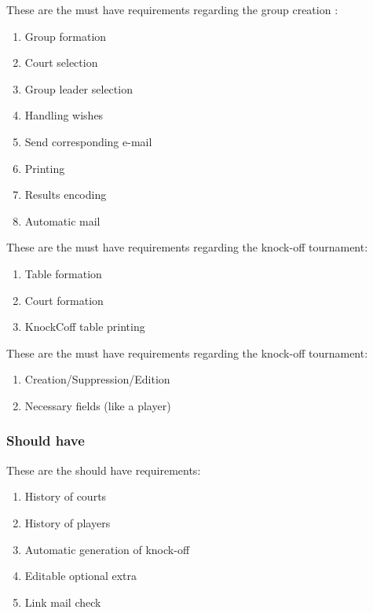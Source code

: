 These are the must have requirements regarding the group creation :\newline

\begin{enumerate} \itemsep1pt
\item \textcolor{green!60!black} {Group formation}
\item \textcolor{green!60!black} {Court selection}
\item \textcolor{green!60!black} {Group leader selection}
\item \textcolor{green!60!black} {Handling wishes}
\item \textcolor{green!60!black} {Send corresponding e-mail}
\item \textcolor{green!60!black} {Printing}
\item \textcolor{green!60!black} {Results encoding}
\item \textcolor{green!60!black} {Automatic mail}
\end{enumerate}

These are the must have requirements regarding the knock-off tournament: \newline

\begin{enumerate} \itemsep1pt
\item \textcolor{green!60!black} {Table formation}
\item \textcolor{green!60!black} {Court formation}
\item \textcolor{green!60!black} {KnockCoff table printing}
\end{enumerate}


These are the must have requirements regarding the knock-off tournament: \newline

\begin{enumerate} \itemsep1pt
\item \textcolor{green!60!black} {Creation/Suppression/Edition}
\item \textcolor{green!60!black} {Necessary fields (like a player)}
\end{enumerate}

\subsubsection{Should have}
\label{Should have}

These are the should have requirements: \newline

\begin{enumerate} \itemsep1pt
\item \textcolor{green!60!black} {History of courts}
\item \textcolor{green!60!black} {History of players}
\item \textcolor{green!60!black} {Automatic generation of knock-off}
\item \textcolor{green!60!black} {Editable optional extra}
\item \textcolor{green!60!black} {Link mail check}
\end{enumerate}

